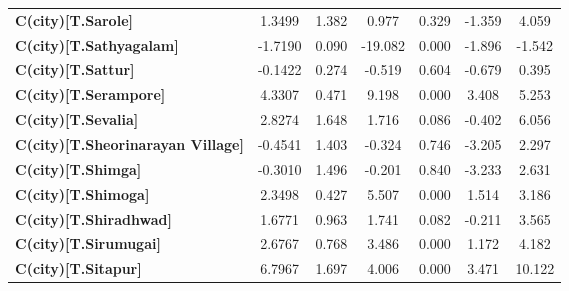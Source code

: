 \begin{center}
\begin{tabular}{lcccccc}
\textbf{C(city)[T.Sarole]}                                                                          &       1.3499  &        1.382     &     0.977  &         0.329        &       -1.359    &        4.059     \\
\textbf{C(city)[T.Sathyagalam]}                                                                     &      -1.7190  &        0.090     &   -19.082  &         0.000        &       -1.896    &       -1.542     \\
\textbf{C(city)[T.Sattur]}                                                                          &      -0.1422  &        0.274     &    -0.519  &         0.604        &       -0.679    &        0.395     \\
\textbf{C(city)[T.Serampore]}                                                                       &       4.3307  &        0.471     &     9.198  &         0.000        &        3.408    &        5.253     \\
\textbf{C(city)[T.Sevalia]}                                                                         &       2.8274  &        1.648     &     1.716  &         0.086        &       -0.402    &        6.056     \\
\textbf{C(city)[T.Sheorinarayan Village]}                                                           &      -0.4541  &        1.403     &    -0.324  &         0.746        &       -3.205    &        2.297     \\
\textbf{C(city)[T.Shimga]}                                                                          &      -0.3010  &        1.496     &    -0.201  &         0.840        &       -3.233    &        2.631     \\
\textbf{C(city)[T.Shimoga]}                                                                         &       2.3498  &        0.427     &     5.507  &         0.000        &        1.514    &        3.186     \\
\textbf{C(city)[T.Shiradhwad]}                                                                      &       1.6771  &        0.963     &     1.741  &         0.082        &       -0.211    &        3.565     \\
\textbf{C(city)[T.Sirumugai]}                                                                       &       2.6767  &        0.768     &     3.486  &         0.000        &        1.172    &        4.182     \\
\textbf{C(city)[T.Sitapur]}                                                                         &       6.7967  &        1.697     &     4.006  &         0.000        &        3.471    &       10.122     \\

\end{tabular}
\end{center}
